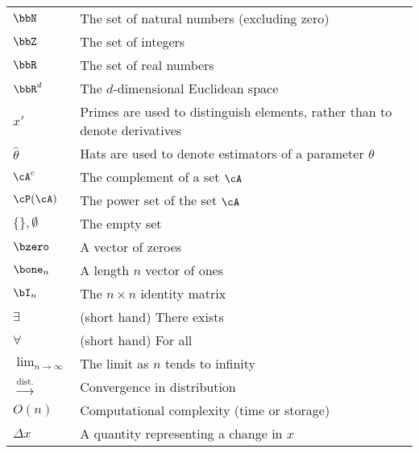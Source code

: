 \begin{longtable}{p{}p{}}
  $\bbN$   & The set of natural numbers (excluding zero) \\
  $\bbZ$   & The set of integers \\
  $\bbR$   & The set of real numbers \\
  $\bbR^d$   & The $d$-dimensional Euclidean space \\  
  $x'$   & Primes are used to distinguish elements, rather than to denote derivatives \\    
  $\hat\theta$   & Hats are used to denote estimators of a parameter $\theta$ \\   
  $\cA^c$  &  The complement of a set $\cA$ \\
  $\cP(\cA)$  &  The power set of the set $\cA$ \\  
  $\{ \}, \emptyset$  &  The empty set \\    
  $\bzero$  & A vector of zeroes \\
  $\bone_n$  & A length $n$ vector of ones \\
  $\bI_n$  & The $n \times n$ identity matrix \\
  $\exists$  &  (short hand) There exists\\
  $\forall$  &  (short hand) For all \\
  $\lim_{n \to \infty}$  &  The limit as $n$ tends to infinity \\  
  $\xrightarrow{\text{dist.}}$ & Convergence in distribution \\
  $O(n)$ & Computational complexity (time or storage) \\
  $\Delta x$ & A quantity representing a change in $x$    
\end{longtable}

